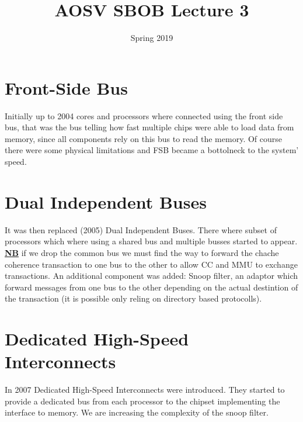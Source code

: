 \documentclass[a4paper,12pt]{article}
\begin{document}
\title{AOSV SBOB Lecture 3}
\author{}
\date{Spring 2019}
\maketitle


\section{Front-Side Bus }
Initially up to 2004 cores and processors where connected using the front side bus, that was the bus telling how fast multiple chips were able to load data from memory, since all components rely on this bus to read the memory. Of course there were some physical limitations and FSB became a bottolneck to the system' speed. 
\section{Dual Independent Buses}
It was then replaced (2005) Dual Independent Buses. There where subset of processors which where using a shared bus and multiple busses started to appear. \underline{\textbf{NB}} if we drop the common bus we must find the way to forward the chache coherence transaction to one bus to the other to allow CC and MMU to exchange transactions. An additional component was added: Snoop filter, an adaptor which forward messages from one bus to the other depending on the actual destintion of the transaction (it is possible only reling on directory based protocolls).
\section{Dedicated High-Speed Interconnects}
In 2007 Dedicated High-Speed Interconnects were introduced. They started to provide a dedicated bus from each processor to the chipset implementing the interface to memory. We are increasing the complexity of the snoop filter. 
\end{document}
